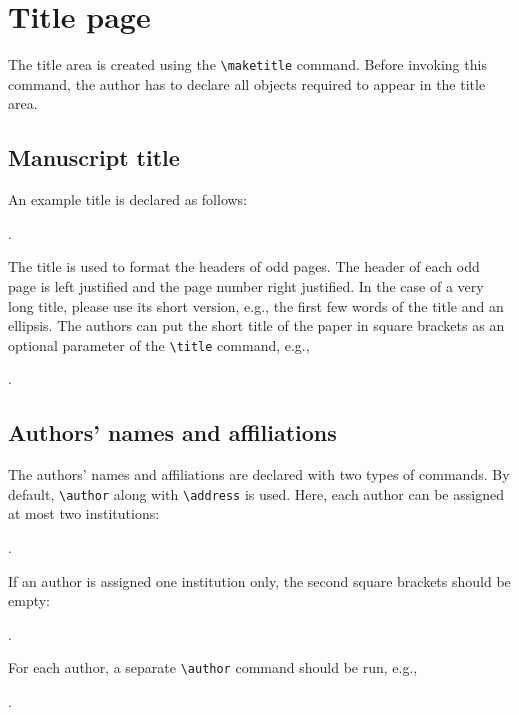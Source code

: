 \documentclass{amcs}
\begin{document}
\section{Title page}
The title area is created using the \verb+\maketitle+ command. Before invoking this command, the author has to declare all objects required to appear in the title area.

\subsection{Manuscript title}
\label{title}
An example title is declared as follows:

\medskip
{}.

\medskip\noindent
The title is used to format the headers of odd pages. The header of each odd page is left justified and the page number right justified. In the case of a very long title, please use its short version, e.g., the first few words of the title and an ellipsis. The authors can put the short title of the paper in square brackets as an optional parameter of the \verb+\title+ command, e.g.,

\medskip
{}.

\subsection{Authors' names and affiliations}
The authors' names and affiliations are declared with two types of commands. By default, \verb+\author+ along with \verb+\address+ is used. Here, each author can be assigned at most two institutions:

\medskip
{}.

\medskip\noindent
If an author is assigned one institution only, the second square brackets should be empty:

\medskip
{}.

\medskip\noindent
For each author, a separate \verb+\author+ command should be run, e.g.,

\medskip
{}
.
\end{document}
